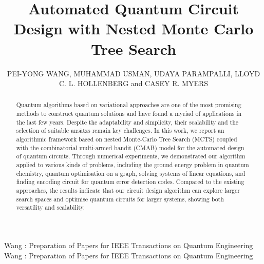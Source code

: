 \documentclass{ieeeaccess}
\begin{document}

\title{Automated Quantum Circuit Design with Nested Monte Carlo Tree Search}






\author{\uppercase{Pei-Yong Wang},
\uppercase{Muhammad Usman}, \uppercase{Udaya Parampalli}, \uppercase{Lloyd C. L. Hollenberg} and \uppercase{Casey R. Myers}}




\address[1]{School of Computing and Information Systems, Faculty of Engineering and Information Technology, The University of Melbourne, Melbourne VIC 3010, Australia}
\address[2]{School of Physics, The University of Melbourne, Parkville, VIC 3010, Australia}
\address[3]{Data61, CSIRO, Clayton, Victoria, Australia}
\address[4]{Silicon Quantum Computing Pty Ltd., Level 2, Newton Building, UNSW Sydney, Kensington, NSW 2052, Australia}

\markboth
{Wang \headeretal: Preparation of Papers for IEEE Transactions on Quantum Engineering}
{Wang \headeretal: Preparation of Papers for IEEE Transactions on Quantum Engineering}










\begin{abstract}
Quantum algorithms based on variational approaches are one of the most promising methods to construct quantum solutions and have found a myriad of applications in the last few years. Despite the adaptability and simplicity, their scalability and the selection of suitable ans\"atzs remain key challenges. In this work, we report an algorithmic framework based on nested Monte-Carlo Tree Search (MCTS) coupled with the combinatorial multi-armed bandit (CMAB) model  for the automated design of quantum circuits. Through numerical experiments, we demonstrated our algorithm applied to various kinds of problems, including the ground energy problem in quantum chemistry, quantum optimisation on a graph, solving  systems of linear equations, and finding encoding circuit for quantum error detection codes. Compared to the existing approaches, the results indicate that our circuit design algorithm can explore larger search spaces and optimise quantum circuits for larger systems, showing both versatility and scalability.
\end{abstract}
\end{document}
